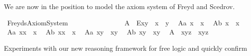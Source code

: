 \begin{isabellebody}
\begin{isamarkuptext}%
We are now in the position to model the axiom system of Freyd and Scedrov.%
\end{isamarkuptext}%
\isamarkuptrue%
\isamarkupfalse%
\ FreydsAxiomSystem\ \ \ \ \ \ \ \ \ \ \ \ \ \ \ \isanewline
\ A{}{\isacharcolon}\ \ {\isachardoublequoteopen}\isactrlbold E{\isacharparenleft}x{\isasymcdot}y{\isacharparenright}\ \isactrlbold {\isasymleftrightarrow}\ {\isacharparenleft}{\isacharparenleft}x{\isasymbox}{\isacharparenright}\ {\isasymapprox}\ {\isacharparenleft}{\isasymbox}y{\isacharparenright}{\isacharparenright}{\isachardoublequoteclose}\ \isanewline
\ A{}a{\isacharcolon}\ {\isachardoublequoteopen}{\isacharparenleft}{\isacharparenleft}{\isasymbox}x{\isacharparenright}{\isasymbox}{\isacharparenright}\ {\isasymapprox}\ {\isasymbox}x{\isachardoublequoteclose}\ \isanewline
\ A{}b{\isacharcolon}\ {\isachardoublequoteopen}{\isasymbox}{\isacharparenleft}x{\isasymbox}{\isacharparenright}\ {\isasymapprox}\ {\isasymbox}x{\isachardoublequoteclose}\ \isanewline
\ A{}a{\isacharcolon}\ {\isachardoublequoteopen}{\isacharparenleft}{\isasymbox}x{\isacharparenright}{\isasymcdot}x\ {\isasymapprox}\ x{\isachardoublequoteclose}\ \isanewline
\ A{}b{\isacharcolon}\ {\isachardoublequoteopen}x{\isasymcdot}{\isacharparenleft}x{\isasymbox}{\isacharparenright}\ {\isasymapprox}\ x{\isachardoublequoteclose}\ \isanewline
\ A{}a{\isacharcolon}\ {\isachardoublequoteopen}{\isasymbox}{\isacharparenleft}x{\isasymcdot}y{\isacharparenright}\ {\isasymapprox}\ {\isasymbox}{\isacharparenleft}x{\isasymcdot}{\isacharparenleft}{\isasymbox}y{\isacharparenright}{\isacharparenright}{\isachardoublequoteclose}\ \isanewline
\ A{}b{\isacharcolon}\ {\isachardoublequoteopen}{\isacharparenleft}x{\isasymcdot}y{\isacharparenright}{\isasymbox}\ {\isasymapprox}\ {\isacharparenleft}{\isacharparenleft}x{\isasymbox}{\isacharparenright}{\isasymcdot}y{\isacharparenright}{\isasymbox}{\isachardoublequoteclose}\ \isanewline
\ A{}{\isacharcolon}\ \ {\isachardoublequoteopen}x{\isasymcdot}{\isacharparenleft}y{\isasymcdot}z{\isacharparenright}\ {\isasymapprox}\ {\isacharparenleft}x{\isasymcdot}y{\isacharparenright}{\isasymcdot}z{\isachardoublequoteclose}%
\begin{isamarkuptext}%
Experiments with our new reasoning framework for free logic and quickly confirm 

\end{isamarkuptext}
\end{isabellebody}
